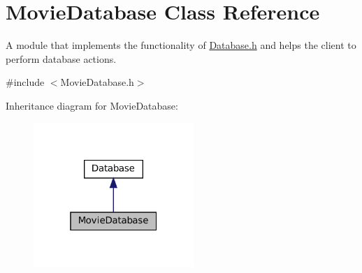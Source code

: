 \hypertarget{classMovieDatabase}{}\section{Movie\+Database Class Reference}
\label{classMovieDatabase}


A module that implements the functionality of \hyperlink{Database_8h_source}{Database.\+h} and helps the client to perform database actions.  




{\ttfamily \#include $<$Movie\+Database.\+h$>$}



Inheritance diagram for Movie\+Database\+:
\nopagebreak
\begin{figure}[H]
\begin{center}
\leavevmode
\includegraphics[width=172pt]{classMovieDatabase__inherit__graph}
\end{center}
\end{figure}



